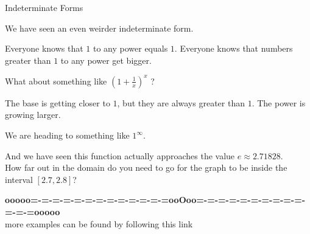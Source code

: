 \documentclass{ximera}
\begin{document}
\begin{example} Indeterminate Forms

We have seen an even weirder indeterminate form.

Everyone knows that $1$ to any power equals $1$. Everyone knows that numbers greater than $1$ to any power get bigger.


What about something like $\left( 1 + \frac{1}{x} \right)^x$ ?

The base is getting closer to $1$, but they are always greater than $1$.  The power is growing larger.  

We are heading to something like $1^{\infty}$.

And we have seen this function actually approaches the value $e \approx 2.71828$. \\

How far out in the domain do you need to go for the graph to be inside the interval $[2.7, 2.8]$?








\begin{center}
\end{center}









\end{example}














\begin{center}
\textbf{\textcolor{green!50!black}{ooooo=-=-=-=-=-=-=-=-=-=-=-=-=ooOoo=-=-=-=-=-=-=-=-=-=-=-=-=ooooo}} \\

more examples can be found by following this link\\ 

\end{center}
\end{document}

